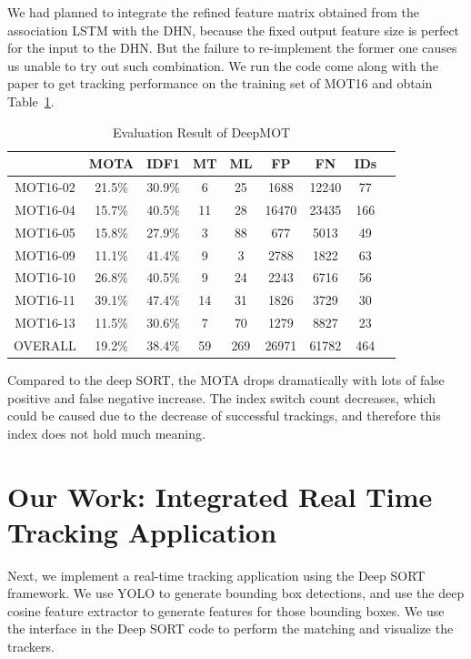 \documentclass[conference]{IEEEtran}
\begin{document}

We had planned to integrate the refined feature matrix obtained from the association LSTM with the DHN, because the fixed output feature size is perfect for the input to the DHN.
But the failure to re-implement the former one causes us unable to try out such combination.
We run the code come along with the paper to get tracking performance on the training set of MOT16 and obtain Table~\ref{tab:eval-deepmot}.

\linespread{1.2}
\begin{table}[h]
    \caption{Evaluation Result of DeepMOT}
    \label{tab:eval-deepmot}
    \begin{tabular}{ccccccccc}
        \hline
        & MOTA & IDF1 & MT & ML & FP & FN & IDs\\\hline
        MOT16-02 & 21.5\% & 30.9\% & 6 & 25 & 1688 & 12240 & 77\\
        MOT16-04 & 15.7\% & 40.5\% & 11 & 28 & 16470 & 23435 & 166\\
        MOT16-05 & 15.8\% & 27.9\% & 3 & 88 & 677 & 5013 & 49\\
        MOT16-09 & 11.1\% & 41.4\% & 9 & 3 & 2788 & 1822 & 63\\
        MOT16-10 & 26.8\% & 40.5\% & 9 & 24 & 2243 & 6716 & 56\\
        MOT16-11 & 39.1\% & 47.4\% & 14 & 31 & 1826 & 3729 & 30\\
        MOT16-13 & 11.5\% & 30.6\% & 7 & 70 & 1279 & 8827 & 23\\
        OVERALL & 19.2\% & 38.4\% & 59 & 269 & 26971 & 61782 & 464\\\hline
    \end{tabular}
\end{table}
\linespread{1.0}

Compared to the deep SORT, the MOTA drops dramatically with lots of false positive and false negative increase.
The index switch count decreases, which could be caused due to the decrease of successful trackings, and therefore this index does not hold much meaning.


\section{Our Work: Integrated Real Time Tracking Application}
Next, we implement a real-time tracking application using the Deep SORT framework.
We use YOLO to generate bounding box detections, and use the deep cosine feature extractor to generate features for those bounding boxes.
We use the interface in the Deep SORT code to perform the matching and visualize the trackers.
\end{document}
